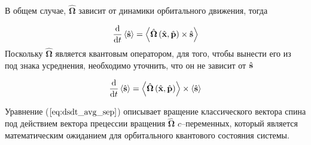 \begin{frame}
	\frametitle{}
	\par В общем случае, $\hat{\boldsymbol{\Omega}}$ зависит от динамики орбитального движения, тогда 
	
	\begin{equation}
		\dv{}{t} \left\langle\hat{\vectorbold{s}}\right\rangle = \left\langle\hat{\boldsymbol{\Omega}}\left(\hat{\vectorbold{x}}, \hat{\vectorbold{p}}\right) \times \hat{\vectorbold{s}}\right\rangle
		\label{eq:dsdt_orbital}
	\end{equation}
	\noindent Поскольку $\hat{\boldsymbol{\Omega}}$ является квантовым оператором, для того, чтобы вынести его из под знака усреднения, необходимо уточнить, что он не зависит от $\hat{\vectorbold{s}}$
	
	\begin{equation}
		\dv{}{t} \left\langle\hat{\vectorbold{s}}\right\rangle = \left\langle\hat{\boldsymbol{\Omega}}\left(\hat{\vectorbold{x}}, \hat{\vectorbold{p}}\right)\right\rangle \times \left\langle\hat{\vectorbold{s}}\right\rangle
		\label{eq:dsdt_avg_sep}
	\end{equation}
	
	\noindent Уравнение ($\ref{eq:dsdt_avg_sep}$) описывает вращение классического вектора спина под действием вектора прецессии вращения $\hat{\boldsymbol{\Omega}}$ $c$–переменных, который является математическим ожиданием для орбитального квантового состояния системы.
	 
\end{frame}


